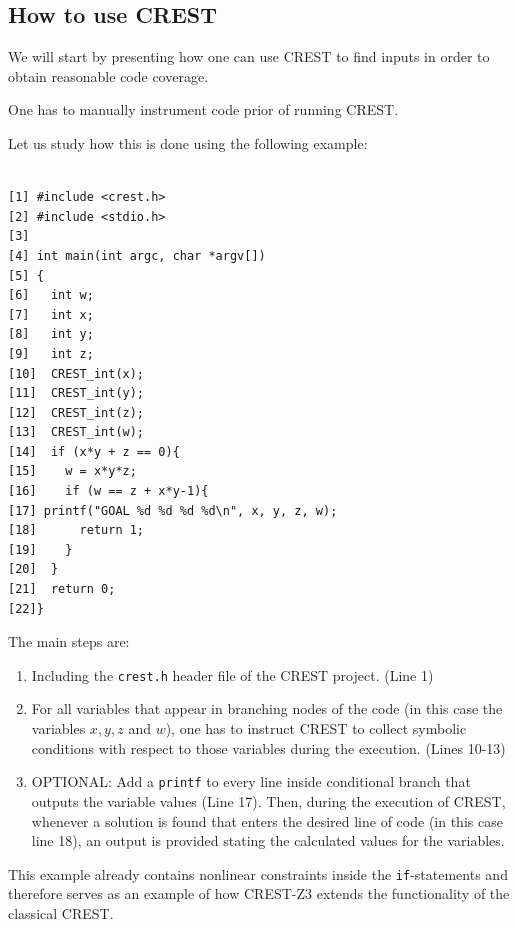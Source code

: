 \documentclass[oribibl, twocolumn]{llncs}
\begin{document}
\subsection{How to use \textsc{CREST}}
We will start by presenting how one can use \textsc{CREST} to find
inputs in order to obtain reasonable code coverage.

One has to manually instrument code prior of running \textsc{CREST}.

Let us study how this is done using the following example:

\begin{example}
\label{ex:codeForDemo}
\begin{verbatim}

[1] #include <crest.h>
[2] #include <stdio.h>
[3]  
[4] int main(int argc, char *argv[])
[5] {
[6]   int w;
[7]   int x;
[8]   int y;
[9]   int z;
[10]  CREST_int(x);
[11]  CREST_int(y);
[12]  CREST_int(z);
[13]  CREST_int(w);
[14]  if (x*y + z == 0){
[15]    w = x*y*z;
[16]    if (w == z + x*y-1){
[17] printf("GOAL %d %d %d %d\n", x, y, z, w);
[18]      return 1;
[19]    }
[20]  }	
[21]  return 0;
[22]}
\end{verbatim}
\end{example}

The main steps are:
\begin{enumerate}
  \item Including the \texttt{crest.h} header file of the
    \textsc{CREST} project. (Line 1)
   \item For all variables that appear in branching nodes of the code
     (in this case the variables $x,y,z$ and $w$), one has to instruct
     \textsc{CREST} to collect symbolic conditions with respect to
     those variables during the
     execution. (Lines 10-13)
   \item OPTIONAL: Add a
     \texttt{printf} to every line inside conditional branch that
     outputs the variable values (Line 17). Then, during the execution of
     \textsc{CREST}, whenever a solution is found that enters the
     desired line of code (in this case line 18), an output is
     provided stating the calculated values for the variables.
\end{enumerate}

\begin{remark}
  This example already contains nonlinear constraints inside the
  \texttt{if}-statements and therefore serves as an example of how
  \textsc{CREST-Z3} extends the functionality of the classical \textsc{CREST}.
\end{remark}
\end{document}
